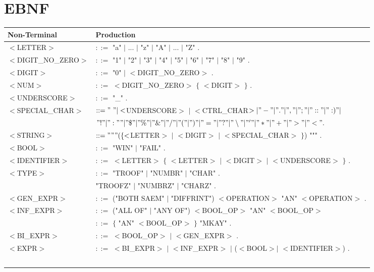 \documentclass[draft]{llncs}
\begin{document}
\section{EBNF}


\begin{table}[h]\scriptsize
\begin{center}
	\begin{tabular}{ll}

\toprule
\textbf{Non-Terminal} & \textbf{Production} \\
\midrule
$<$LETTER$>$ & $::=$ "a" $|$ ... $|$ "z" $|$ "A" $|$ ... $|$ "Z" . \\
$<$DIGIT\_NO\_ZERO$>$ & $::=$ "1" $|$ "2" $|$ "3" $|$ "4" $|$ "5" $|$ "6" $|$ "7" $|$ "8" $|$ "9" . \\
$<$DIGIT$>$ & $::=$ "0" $|$ $<$DIGIT\_NO\_ZERO$>$ . \\
$<$NUM$>$ & $::=$ $<$DIGIT\_NO\_ZERO$>$ $\lbrace$ $<$DIGIT$>$ $\rbrace$ . \\
$<$UNDERSCORE$>$ & $::=$ "\_" . \\
$<$SPECIAL\_CHAR$>$ & $ ::= "\ " | <$UNDERSCORE$>$ $|$ $<$CTRL\_CHAR$> | "-" | "." | "," | ";" | "::" | ":)" | $ \\ 
			& \qquad $ "!" | ":"" | "\$" | "\%" | "\&" | "/" | "(" | ")" | "=" | "?" | "\setminus" | "'" | "*" | "+" | ">" | "<" . $ \\
$<$STRING$>$ & $ ::= """ ( \lbrace <$LETTER$>$ $|$ $<$DIGIT$>$ $|$ $<$SPECIAL\_CHAR$>$ $\rbrace$) """ . \\
$<$BOOL$>$ & $::=$ "WIN" $|$ "FAIL" . \\
$<$IDENTIFIER$>$ & $::=$ $<$LETTER$>$ $\lbrace$ $<$LETTER$>$ $|$ $<$DIGIT$>$ $|$ $<$UNDERSCORE$>$ $\rbrace$ . \\
$<$TYPE$>$ & $::=$ "TROOF" $|$ "NUMBR" $|$ "CHAR" . \\
		& \qquad "TROOFZ" $|$ "NUMBRZ" $|$ "CHARZ" . \\
$<$GEN\_EXPR$>$ & $::=$ ("BOTH SAEM" $|$ "DIFFRINT") $<$OPERATION$>$ "AN" $<$OPERATION$>$ . \\
$<$INF\_EXPR$>$ & $::=$ ("ALL OF" $|$ "ANY OF") $<$BOOL\_OP$>$ "AN" $<$BOOL\_OP$>$ \\
 & $::=$ $\lbrace$ "AN" $<$BOOL\_OP$>$ $\rbrace$ "MKAY" . \\
$<$BI\_EXPR$>$ & $::=$ $<$BOOL\_OP$>$  $|$ $<$GEN\_EXPR$>$ . \\
$<$EXPR$>$ & $::=$ $<$BI\_EXPR$>$ $|$ $<$INF\_EXPR$>$ $|$ ($<$BOOL$>$$|$ $<$IDENTIFIER$>$) . \\
$$
\end{tabular}
\end{center}
\end{table}
\end{document}
